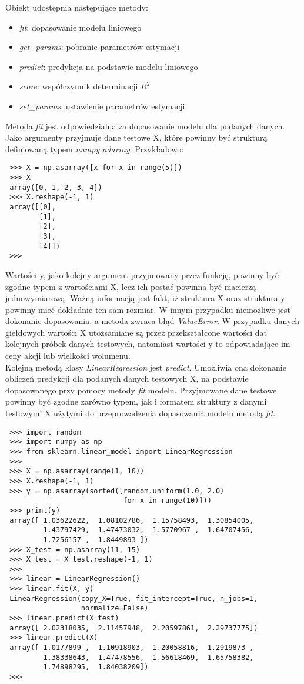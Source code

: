Obiekt udostępnia następujące metody:
\begin{itemize}
 \item \textit{fit}: dopasowanie modelu liniowego
 \item \textit{get\_params}: pobranie parametrów estymacji
 \item \textit{predict}: predykcja na podstawie modelu liniowego
 \item \textit{score}: współczynnik determinacji $R^2$
 \item \textit{set\_params}: ustawienie parametrów estymacji
\end{itemize}

Metoda \textit{fit} jest odpowiedzialna za dopasowanie modelu dla podanych danych. Jako argumenty przyjmuje dane testowe X, które powinny być strukturą definiowaną typem \textit{numpy.ndarray}. Przykładowo:
\begin{lstlisting}
 >>> X = np.asarray([x for x in range(5)])
 >>> X
 array([0, 1, 2, 3, 4])
 >>> X.reshape(-1, 1)
 array([[0],
        [1],
        [2],
        [3],
        [4]])
 >>>
\end{lstlisting}
Wartości y, jako kolejny argument przyjmowany przez funkcję, powinny być zgodne typem z wartościami X, lecz ich postać powinna być macierzą jednowymiarową.
Ważną informacją jest fakt, iż struktura X oraz struktura y powinny mieć dokładnie ten sam rozmiar. W innym przypadku niemożliwe jest dokonanie dopasowania, a metoda zwraca błąd \textit{ValueError}.
W przypadku danych giełdowych wartości X utożsamiane są przez przekształcone wartości dat kolejnych próbek danych testowych, natomiast wartości y to odpowiadające im ceny akcji lub wielkości wolumenu.\\

Kolejną metodą klasy \textit{LinearRegression} jest \textit{predict}. Umożliwia ona dokonanie obliczeń predykcji dla podanych danych testowych X, na podstawie dopasowanego przy pomocy metody \textit{fit} modelu.
Przyjmowane dane testowe powinny być zgodne zarówno typem, jak i formatem struktury z danymi testowymi X użytymi do przeprowadzenia dopasowania modelu metodą \textit{fit}.

\begin{lstlisting}
 >>> import random
 >>> import numpy as np
 >>> from sklearn.linear_model import LinearRegression
 >>>
 >>> X = np.asarray(range(1, 10))
 >>> X.reshape(-1, 1)
 >>> y = np.asarray(sorted([random.uniform(1.0, 2.0)
                            for x in range(10)]))
 >>> print(y)
 array([ 1.03622622,  1.08102786,  1.15758493,  1.30854005,
         1.43797429,  1.47473032,  1.5770967 ,  1.64707456,
         1.7256157 ,  1.8449893 ])
 >>> X_test = np.asarray(11, 15)
 >>> X_test = X_test.reshape(-1, 1)
 >>>
 >>> linear = LinearRegression()
 >>> linear.fit(X, y)
 LinearRegression(copy_X=True, fit_intercept=True, n_jobs=1,
                  normalize=False)
 >>> linear.predict(X_test)
 array([ 2.02318035,  2.11457948,  2.20597861,  2.29737775])
 >>> linear.predict(X)
 array([ 1.0177899 ,  1.10918903,  1.20058816,  1.2919873 ,
         1.38338643,  1.47478556,  1.56618469,  1.65758382,
         1.74898295,  1.84038209])
 >>>
\end{lstlisting}


